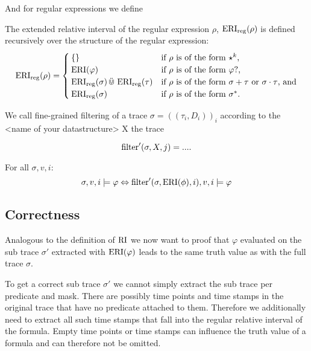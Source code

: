 And for regular expressions we define 
\begin{definition}
    The extended relative interval of the regular expression $\rho$, $\operatorname{ERI}_{\text{reg}}(\rho)$ is defined recursively over the structure of the regular expression:
    \begin{equation*}
        \operatorname{ERI}_{\text{reg}}(\rho) =
        \begin{cases}
            \{\} & \text{if $\rho$ is of the form $\star^k$,} \\
            \operatorname{ERI}(\varphi) & \text{if $\rho$ is of the form $\varphi ?$,} \\
            \operatorname{ERI}_{\text{reg}}(\sigma) \,\ddot{\Cup}\, \operatorname{ERI}_{\text{reg}}(\tau) & \text{if $\rho$ is of the form $\sigma + \tau$ or $\sigma \cdot \tau$, and} \\
            \operatorname{ERI}_{\text{reg}}(\sigma) & \text{if $\rho$ is of the form $\sigma^*$.}
        \end{cases}
    \end{equation*}
\end{definition}

\begin{definition}
    We call fine-grained filtering of a trace $\sigma=((\tau_i,D_i))_i$ according to the <name of your datastructure> X the trace 
    
    \begin{equation*}
        \operatorname{filter}'(\sigma, X, j) = ....
    \end{equation*}
\end{definition} 

\begin{theorem}
    For all $\sigma, v, i$:
    \begin{equation*}
        \sigma, v, i \models \varphi 
        \Leftrightarrow \operatorname{filter}'(\sigma, \operatorname{ERI}(\phi), i), v, i \models \varphi
    \end{equation*}
\end{theorem} 

\subsection{Correctness}
Analogous to the definition of $\operatorname{RI}$ we now want to proof that $\varphi$ evaluated on the sub trace $\sigma'$ extracted with $\operatorname{ERI}(\varphi)$ leads to the same truth value as with the full trace $\sigma$.

To get a correct sub trace $\sigma'$ we cannot simply extract the sub trace per predicate and mask.
There are possibly time points and time stamps in the original trace that have no predicate attached to them.
Therefore we additionally need to extract all such time stamps that fall into the regular relative interval of the formula.
Empty time points or time stamps can influence the truth value of a formula and can therefore not be omitted.

